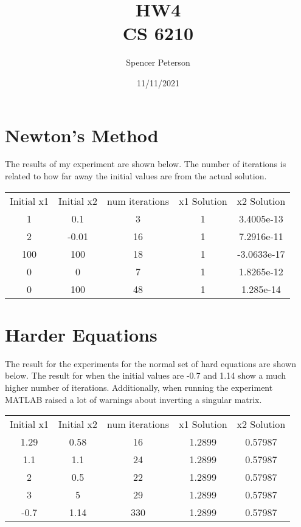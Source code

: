 \documentclass{article}
\title{HW4 \\
	\large CS 6210}
\date{11/11/2021}
\author{Spencer Peterson}
\begin{document}
\maketitle


\section{Newton's Method}

The results of my experiment are shown below. The number of iterations is related to how far away the initial values are from the actual solution. 
\begin{center}
\begin{tabular}{ccccc}
Initial x1 & Initial x2 & num iterations & x1 Solution & x2 Solution\\
1 & 0.1 & 3 & 1 & 3.4005e-13\\
2 & -0.01 & 16 & 1 & 7.2916e-11\\
100 & 100 & 18 & 1 & -3.0633e-17\\
0 & 0 & 7 & 1 & 1.8265e-12\\
0 & 100 & 48 & 1 & 1.285e-14
\end{tabular}

\end{center}

\section{Harder Equations}


The result for the experiments for the normal set of hard equations are shown below. The result for when the initial values are -0.7 and 1.14 show a much higher number of iterations. Additionally, when running the experiment MATLAB raised a lot of warnings about inverting a singular matrix.
\begin{center}
\begin{tabular}{ccccc}
Initial x1 & Initial x2 & num iterations & x1 Solution & x2 Solution\\
1.29 & 0.58 & 16 & 1.2899 & 0.57987\\
1.1 & 1.1 & 24 & 1.2899 & 0.57987\\
2 & 0.5 & 22 & 1.2899 & 0.57987\\
3 & 5 & 29 & 1.2899 & 0.57987\\
-0.7 & 1.14 & 330 & 1.2899 & 0.57987
\end{tabular}

\end{center}
\end{document}
